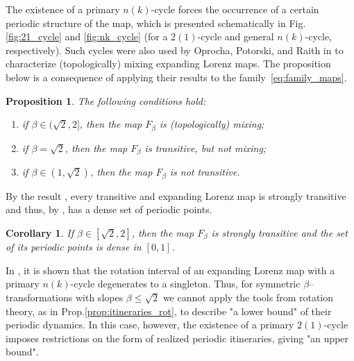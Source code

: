 \documentclass[10pt,reqno]{amsart}
\theoremstyle{plain}
\theoremstyle{assumption}
\theoremstyle{notation}
\theoremstyle{claim}
\theoremstyle{conj}
\theoremstyle{theorem}
\theoremstyle{proposition}
\newtheorem{proposition}{Proposition}[section]
\theoremstyle{corollary}
\newtheorem{corollary}{Corollary}[section]
\begin{document}
The existence of a primary $n(k)$-cycle forces the occurrence of a certain periodic structure of the map, which is presented schematically in Fig.\ref{fig:21_cycle} and \ref{fig:nk_cycle} (for a $2(1)$-cycle and general $n(k)$-cycle, respectively). Such cycles were also used by Oprocha, Potorski, and Raith in \cite{OPR} to characterize (topologically) mixing expanding Lorenz maps. The proposition below is a consequence of applying their results to the family~\eqref{eq:family_maps}.
\begin{proposition}\label{prop:mixing_trans}
        The following conditions hold:
    \begin{enumerate}
        \item if $\beta\in(\sqrt{2},2]$, then the map $F_{\beta}$ is (topologically) mixing;
        \item if $\beta=\sqrt{2}$, then the map $F_{\beta}$ is transitive, but not mixing;
        \item if $\beta\in(1,\sqrt{2})$, then the map $F_{\beta}$ is not transitive.
    \end{enumerate}
\end{proposition}
By the result \cite[Theorem~4.12]{ChO}, every transitive and expanding Lorenz map is strongly transitive and thus, by \cite[Theorem~3.1.1]{Lectures}, has a dense set of periodic points.
\begin{corollary}
\label{cor:density}  If $\beta\in[\sqrt{2},2]$, then the map $F_{\beta}$ is strongly transitive and the set of its periodic points is dense in $[0,1]$.
\end{corollary}

In \cite{ChO}, it is shown that the rotation interval of an expanding Lorenz map with a primary $n(k)$-cycle degenerates to a singleton. Thus, for symmetric $\beta$--transformations with slopes $\beta\leq\sqrt{2}$ we cannot apply the tools from rotation theory, as in Prop.\ref{prop:itineraries_rot}, to describe "a lower bound" of their periodic dynamics. In this case, however, the existence of a primary $2(1)$-cycle imposes restrictions on the form of realized periodic itineraries, giving "an upper bound".
\end{document}
